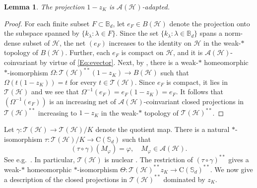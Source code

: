 \documentclass[10pt]{amsart}
\newcommand{\bB}{{\mathbb{B}}}
\newcommand{\bS}{{\mathbb{S}}}
\newcommand{\A}{{\mathcal{A}}}
\renewcommand{\H}{{\mathcal{H}}}
\newcommand{\T}{{\mathcal{T}}}
\newcommand{\rC}{\mathrm{C}}
\renewcommand{\phi}{\varphi}
\newtheorem{lemma}{Lemma}[section]
\theoremstyle{definition}
\begin{document}
\begin{lemma}\label{L:adapted}
The projection $1-z_K$ is $\A(\H)$-adapted.
\end{lemma}
\begin{proof}
For each finite subset $F\subset\bB_d$, let $e_F\in B(\H)$ denote the projection onto the subspace spanned by $\{k_\lambda:\lambda\in F\}$. Since the set $\{k_\lambda:\lambda\in \bB_d\}$ spans a norm-dense subset of $\H$, the net $(e_F)$ increases to the identity on $\H$ in the weak-$*$ topology of $B(\H)$. Further, each $e_F$ is compact on $\H$,  and it is $\A(\H)$-coinvariant by virtue of \eqref{Eq:evector}. Next, by \cite[Lemma 5.5]{CT2023Henkin}, there is a weak-$*$ homeomorphic $*$-isomorphism $\Omega: \T(\H)^{**}(1-z_K)\to B(\H)$ such that $\Omega(t(1-z_K))=t$ for every $t\in \T(\H)$. Since $e_F$ is compact, it lies in $\T(\H)$ and we see that $\Omega^{-1}(e_F)=e_F(1-z_K)=e_F$. It follows that $(\Omega^{-1}(e_F))$ is an increasing net of $\A(\H)$-coinvariant closed projections in $\T(\H)^{**}$ increasing to $1-z_K$ in the weak-$*$ topology of $\T(\H)^{**}$. 
\end{proof}


Let $\gamma:\T(\H)\to \T(\H)/K$ denote the quotient map.  There is a natural $*$-isomorphism $\tau:\T(\H)/K\to \rC(\bS_d)$ such that
\[
(\tau\circ\gamma)(M_\phi)=\phi,\quad M_\phi\in \A(\H).
\]
See e.g.\ \cite{GHX04}. In particular, $\T(\H)$ is nuclear \cite[Exercise 3.8.1]{BO2008}. The restriction of $(\tau\circ \gamma)^{**}$ gives a weak-$*$ homeomorphic $*$-isomorphism $\Theta: \T(\H)^{**}z_K\to  \rC(\bS_d)^{**}$. We now give a description of the closed projections in $\T(\H)^{**}$ dominated by $z_K$.
\end{document}
